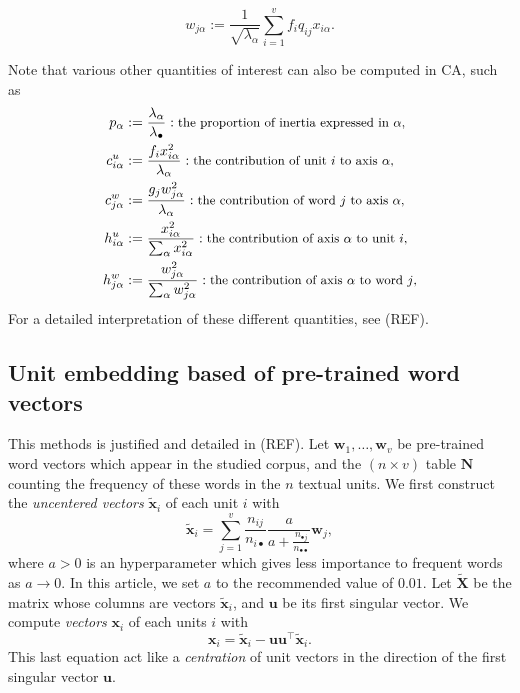 \documentclass[
twocolumn,
]{ceurart}
\begin{document}
\begin{equation}
w_{j\alpha} := \frac{1}{\sqrt{\lambda_\alpha}} \sum_{i=1}^v f_i q_{ij} x_{i \alpha}.
\end{equation}

Note that various other quantities of interest can also be computed in CA, such as 
\begin{align*}
p_\alpha &:= \frac{\lambda_\alpha}{\lambda_\bullet} :\text{\small the proportion of inertia expressed in $\alpha$,} \\
c^u_{i \alpha} &:= \frac{f_i x_{i\alpha}^2}{\lambda_\alpha} : \text{\small the contribution of unit $i$ to axis $\alpha$,} \\
c^w_{j \alpha} &:= \frac{g_j w_{j\alpha}^2}{\lambda_\alpha} : \text{\small the contribution of word $j$ to axis $\alpha$,} \\
h^u_{i \alpha} &:= \frac{x_{i\alpha}^2}{\sum_{\alpha} x_{i\alpha}^2} : \text{\small the contribution of  axis $\alpha$ to unit $i$,} \\
h^w_{j \alpha} &:= \frac{w_{j\alpha}^2}{\sum_{\alpha} w_{j\alpha}^2} : \text{\small the contribution of  axis $\alpha$ to word $j$,}
\end{align*}
For a detailed interpretation of these different quantities, see (REF). 

\subsection{Unit embedding based of pre-trained word vectors}
\label{wv_details}

This methods is justified and detailed in (REF). Let $\mathbf{w}_1, \ldots, \mathbf{w}_v$ be pre-trained word vectors which appear in the studied corpus, and the $(n \times v)$ table $\mathbf{N}$ counting the frequency of these words in the $n$ textual units. We first construct the \emph{uncentered vectors} $\widetilde{\mathbf{x}}_i$ of each unit $i$ with
\begin{equation}
\widetilde{\mathbf{x}}_i = \sum_{j = 1}^v \frac{n_{ij}}{n_{i \bullet}} \frac{a}{a + \frac{n_{\bullet j}}{n_{\bullet \bullet}}} \mathbf{w}_j,
\end{equation}
where $a > 0$ is an hyperparameter which gives less importance to frequent words as $a \to 0$. In this article, we set $a$ to the recommended value of $0.01$. Let $\widetilde{\mathbf{X}}$ be the matrix whose columns are vectors $\widetilde{\mathbf{x}}_i$, and $\mathbf{u}$ be its first singular vector. We compute \emph{vectors} $\mathbf{x}_i$ of each units $i$ with
\begin{equation}
\mathbf{x}_i = \widetilde{\mathbf{x}}_i - \mathbf{u}\mathbf{u}^\top \widetilde{\mathbf{x}}_i.
\end{equation}
This last equation act like a \emph{centration} of unit vectors in the direction of the first singular vector $\mathbf{u}$.


\end{document}
